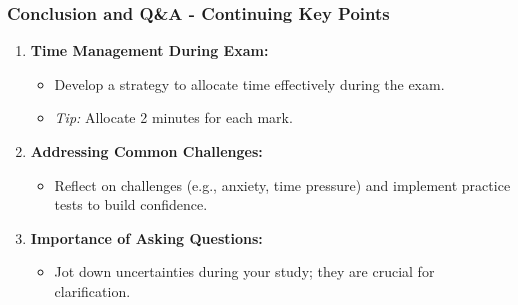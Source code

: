 \documentclass{beamer}
\begin{document}
\begin{frame}[fragile]
    \frametitle{Conclusion and Q\&A - Continuing Key Points}
    \begin{enumerate}[resume]
        \item \textbf{Time Management During Exam:}
        \begin{itemize}
            \item Develop a strategy to allocate time effectively during the exam.
            \item \textit{Tip:} Allocate 2 minutes for each mark.
        \end{itemize}

        \item \textbf{Addressing Common Challenges:}
        \begin{itemize}
            \item Reflect on challenges (e.g., anxiety, time pressure) and implement practice tests to build confidence.
        \end{itemize}

        \item \textbf{Importance of Asking Questions:}
        \begin{itemize}
            \item Jot down uncertainties during your study; they are crucial for clarification.
        \end{itemize}
    \end{enumerate}
\end{frame}
\end{document}
